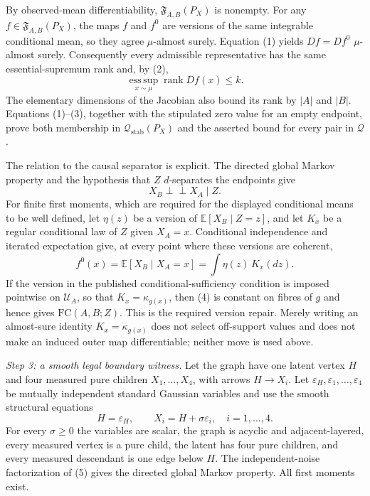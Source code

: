 By observed-mean differentiability, \(\mathfrak F_{A,B}(P_X)\) is nonempty.  For any \(f\in\mathfrak F_{A,B}(P_X)\), the maps \(f\) and \(f^0\) are versions of the same integrable conditional mean, so they agree \(\mu\)-almost surely.  Equation (1) yields \(Df=Df^0\) \(\mu\)-almost surely.  Consequently every admissible representative has the same essential-supremum rank and, by (2),
\[
 \operatorname*{ess\,sup}_{x\sim\mu}\operatorname{rank}Df(x)
 \leq k. \tag{3}
\]
The elementary dimensions of the Jacobian also bound its rank by \(|A|\) and \(|B|\).  Equations (1)--(3), together with the stipulated zero value for an empty endpoint, prove both membership in \(\mathcal Q_{\mathrm{stab}}(P_X)\) and the asserted bound for every pair in \(\mathscr Q\).

The relation to the causal separator is explicit.  The directed global Markov property and the hypothesis that \(Z\) \(d\)-separates the endpoints give
\[
 X_B\mathbin{\perp\!\!\!\perp}X_A\mid Z.
\]
For finite first moments, which are required for the displayed conditional means to be well defined, let \(\eta(z)\) be a version of \(\mathbb E[X_B\mid Z=z]\), and let \(K_x\) be a regular conditional law of \(Z\) given \(X_A=x\).  Conditional independence and iterated expectation give, at every point where these versions are coherent,
\[
 f^0(x)=\mathbb E[X_B\mid X_A=x]
       =\int \eta(z)\,K_x(dz). \tag{4}
\]
If the version in the published conditional-sufficiency condition is imposed pointwise on \(\mathcal U_A\), so that \(K_x=\kappa_{g(x)}\), then (4) is constant on fibres of \(g\) and hence gives \(\mathrm{FC}(A,B;Z)\).  This is the required version repair.  Merely writing an almost-sure identity \(K_x=\kappa_{g(x)}\) does not select off-support values and does not make an induced outer map differentiable; neither move is used above.

\emph{Step 3: a smooth legal boundary witness.}
Let the graph have one latent vertex \(H\) and four measured pure children \(X_1,\ldots,X_4\), with arrows \(H\to X_i\).  Let \(\varepsilon_H,\varepsilon_1,\ldots,\varepsilon_4\) be mutually independent standard Gaussian variables and use the smooth structural equations
\[
 H=\varepsilon_H,
 \qquad
 X_i=H+\sigma\varepsilon_i,\quad i=1,\ldots,4. \tag{5}
\]
For every \(\sigma\geq0\) the variables are scalar, the graph is acyclic and adjacent-layered, every measured vertex is a pure child, the latent has four pure children, and every measured descendant is one edge below \(H\).  The independent-noise factorization of (5) gives the directed global Markov property.  All first moments exist.

